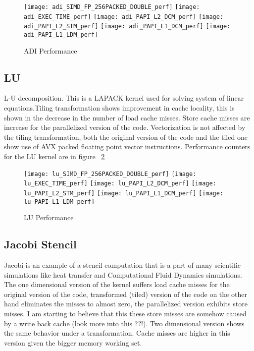\documentclass{article}
\begin{document}
\begin{figure}[h]
\centering
\texttt{[image: adi\_SIMD\_FP\_256PACKED\_DOUBLE\_perf]}
\texttt{[image: adi\_EXEC\_TIME\_perf]}
\texttt{[image: adi\_PAPI\_L2\_DCM\_perf]}
\texttt{[image: adi\_PAPI\_L2\_STM\_perf]}
\texttt{[image: adi\_PAPI\_L1\_DCM\_perf]}
\texttt{[image: adi\_PAPI\_L1\_LDM\_perf]}
\caption{ADI Performance}
\label{adi_perf}
\end{figure} 

\subsection{LU} {
L-U decomposition. This is a LAPACK kernel used for solving system of linear equations.Tiling transformation shows improvement in cache
locality, this is shown in the decrease in the number of load cache misses. Store cache misses are increase for the parallelized version
of the code. Vectorization is not affected by the tiling transformation, both the original version of the code and the tiled one show
use of AVX packed floating point vector instructions. Performance counters for the LU kernel are in figure ~\ref{lu_perf}

\graphicspath{{./latexgraphs/}}

\begin{figure}[h]
\centering
\texttt{[image: lu\_SIMD\_FP\_256PACKED\_DOUBLE\_perf]}
\texttt{[image: lu\_EXEC\_TIME\_perf]}
\texttt{[image: lu\_PAPI\_L2\_DCM\_perf]}
\texttt{[image: lu\_PAPI\_L2\_STM\_perf]}
\texttt{[image: lu\_PAPI\_L1\_DCM\_perf]}
\texttt{[image: lu\_PAPI\_L1\_LDM\_perf]}
\caption{LU Performance}
\label{lu_perf}
\end{figure} 
}

\subsection{Jacobi Stencil} {
Jacobi is an example of a stencil computation that is a part of many scientific simulations like heat transfer and Computational Fluid
Dynamics simulations. The one dimensional version of the kernel suffers load cache misses for the original version of the code, transformed
(tiled) version of the code on the other hand eliminates the misses to almost zero, the parallelized version exhibits store misses.
I am starting to believe that this these store misses are somehow caused by a write back cache (look more into this ??!). Two dimensional 
version shows the same behavior under a transformation. Cache misses are higher in this version given the bigger memory working set.
}
\end{document}
